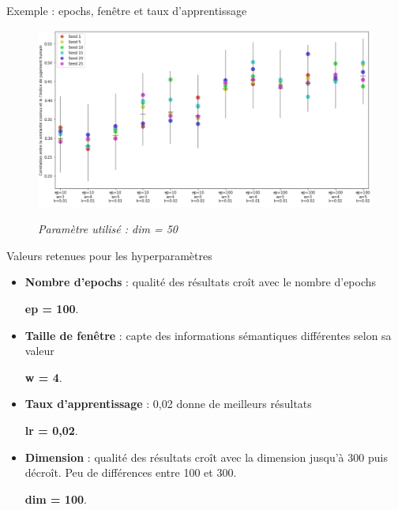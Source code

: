 \documentclass[10pt,xcolor=table,color={dvipsnames,usenames},ignorenonframetext,usepdftitle=false,french]{beamer}
\begin{document}
\begin{frame}{Exemple : epochs, fenêtre et taux d’apprentissage}
\protect\hypertarget{exemple-epochs-fenuxeatre-et-taux-dapprentissage}{}

\begin{figure}[htp]
\begin{center}
\includegraphics[width=1\textwidth]{img/test_parametres.png}
\end{center}
\vspace{-0.3cm}
\footnotesize
\emph{Paramètre utilisé : dim = 50}
\end{figure}

\end{frame}

\begin{frame}{Valeurs retenues pour les hyperparamètres}
\protect\hypertarget{valeurs-retenues-pour-les-hyperparamuxe8tres}{}

\begin{itemize}

\item \textbf{Nombre d'epochs} : qualité des résultats croît avec le nombre d'epochs

\faArrowCircleRight{} \textbf{ep = 100}.

\item \textbf{Taille de fenêtre} : capte des informations sémantiques différentes selon sa valeur

\faArrowCircleRight{} \textbf{w = 4}.

\item \textbf{Taux d'apprentissage} : 0,02 donne de meilleurs résultats

\faArrowCircleRight{} \textbf{lr = 0,02}.

\item \textbf{Dimension} : qualité des résultats croît avec la dimension jusqu'à 300 puis décroît. Peu de différences entre 100 et 300.

\faArrowCircleRight{} \textbf{dim = 100}.

\end{itemize}

\end{frame}
\end{document}
